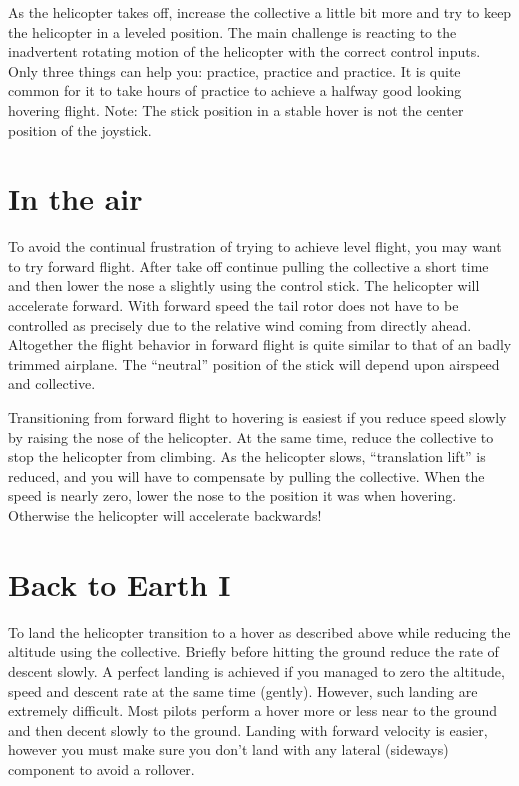 As the helicopter takes off, increase the collective a little bit more and try 
to keep the helicopter in a leveled position. The main challenge is reacting 
to the inadvertent rotating motion of the helicopter with the correct control 
inputs. Only three things can help you: practice, practice and practice. 
It is quite common for it to take hours of practice to achieve a halfway good 
looking hovering flight. Note: The stick position in a stable hover is not 
the center position of the joystick. 

\section{In the air}
 
To avoid the continual frustration of trying to achieve level flight, you may 
want to try forward flight. After take off continue pulling the collective a 
short time and then lower the nose a slightly using the control stick. The 
helicopter will accelerate forward. With forward speed the tail rotor does not 
have to be controlled as precisely due to the relative wind coming from 
directly ahead. Altogether the flight behavior in forward flight is quite 
similar to that of an badly trimmed airplane. The ``neutral'' position of the 
stick will depend upon airspeed and collective. 

Transitioning from forward flight to hovering is easiest if you reduce speed 
slowly by raising the nose of the helicopter. At the same time, reduce the 
collective to stop the helicopter from climbing. As the helicopter slows, 
``translation lift'' is reduced, and you will have to compensate by pulling 
the collective. When the speed is nearly zero, lower the nose to the position 
it was when hovering. Otherwise the helicopter will accelerate backwards! 

\section{Back to Earth I}
 
To land the helicopter transition to a hover as described above while reducing 
the altitude using the collective. Briefly before hitting the ground reduce 
the rate of descent slowly. A perfect landing is achieved if you managed to 
zero the altitude, speed and descent rate at the same time (gently). 
However, such landing are extremely difficult. Most pilots perform a hover 
more or less near to the ground and then decent slowly to the ground. Landing 
with forward velocity is easier, however you must make sure you don't land 
with any lateral (sideways) component to avoid a rollover. 

